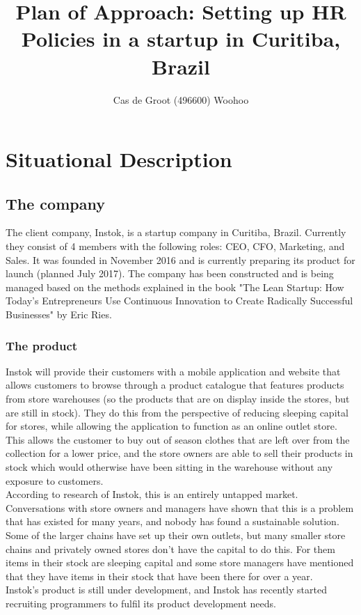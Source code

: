 \documentclass[man]{apa6}
\title{Plan of Approach: Setting up HR Policies in a startup in Curitiba, Brazil}
\author{Cas de Groot (496600) Woohoo}
\affiliation{HAN University of Applied Sciences}
\begin{document}
\maketitle
\tableofcontents
\clearpage
\section{Situational Description}
\subsection{The company}
The client company, Instok, is a startup company in Curitiba, Brazil. Currently they consist of 4 members with the following roles: CEO, CFO, Marketing, and Sales. It was founded in November 2016 and is currently preparing its product for launch (planned July 2017). The company has been constructed and is being managed based on the methods explained in the book "The Lean Startup: How Today's Entrepreneurs Use Continuous Innovation to Create Radically Successful Businesses" by Eric Ries. 

\subsubsection{The product}
Instok will provide their customers with a mobile application and website that allows customers to browse through a product catalogue that features products from store warehouses (so the products that are on display inside the stores, but are still in stock). They do this from the perspective of reducing sleeping capital for stores, while allowing the application to function as an online outlet store. This allows the customer to buy out of season clothes that are left over from the collection for a lower price, and the store owners are able to sell their products in stock which would otherwise have been sitting in the warehouse without any exposure to customers.\\
According to research of Instok, this is an entirely untapped market. Conversations with store owners and managers have shown that this is a problem that has existed for many years, and nobody has found a sustainable solution. Some of the larger chains have set up their own outlets, but many smaller store chains and privately owned stores don't have the capital to do this. For them items in their stock are sleeping capital \parencite{SNELL2009} and some store managers have mentioned that they have items in their stock that have been there for over a year.\\
Instok's product is still under development, and Instok has recently started recruiting programmers to fulfil its product development needs. 
\end{document}
